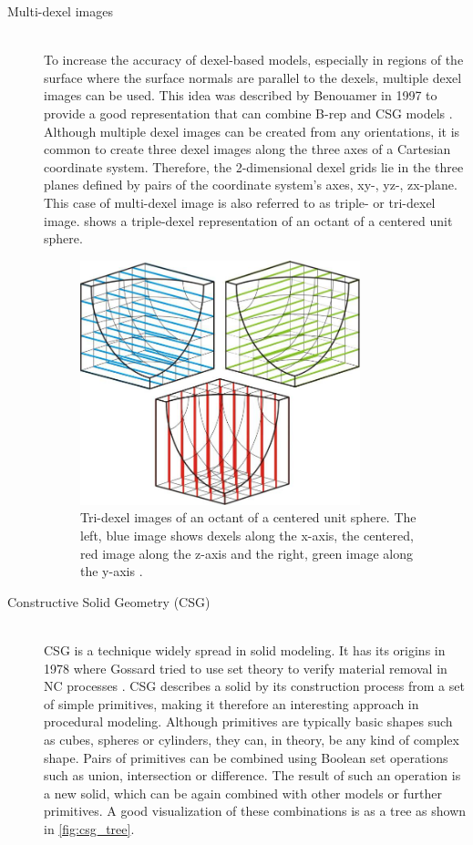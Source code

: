 \begin{description}
	\item[Multi-dexel images] \hfill \\
	To increase the accuracy of dexel-based models, especially in regions of the surface where the surface normals are parallel to the dexels, multiple dexel images can be used.
	This idea was described by Benouamer \etal in 1997 to provide a good representation that can combine B-rep and CSG models \cite{tridexel_intersection}.
	Although multiple dexel images can be created from any orientations, it is common to create three dexel images along the three axes of a Cartesian coordinate system.
	Therefore, the 2-dimensional dexel grids lie in the three planes defined by pairs of the coordinate system's axes, \ie xy-, yz-, zx-plane.
	This case of multi-dexel image is also referred to as triple- or tri-dexel image.
	 shows a triple-dexel representation of an octant of a centered unit sphere.

	\begin{figure}[H]
		\centering
		\includegraphics[width=0.8\textwidth]{images/tridexels}
		\caption{
			Tri-dexel images of an octant of a centered unit sphere.
			The left, blue image shows dexels along the x-axis, the centered, red image along the z-axis and the right, green image along the y-axis \cite{virtual_machining_review}.
		}
		\label{fig:tri_dexel_image}
	\end{figure}


	\item[Constructive Solid Geometry (CSG)] \hfill \\
	CSG is a technique widely spread in solid modeling.
	It has its origins in 1978 where Gossard \etal tried to use set theory to verify material removal in NC processes \cite{csg}.
	CSG describes a solid by its construction process from a set of simple primitives, making it therefore an interesting approach in procedural modeling.
	Although primitives are typically basic shapes such as cubes, spheres or cylinders, they can, in theory, be any kind of complex shape.
	Pairs of primitives can be combined using Boolean set operations such as union, intersection or difference.
	The result of such an operation is a new solid, which can be again combined with other models or further primitives.
	A good visualization of these combinations is as a tree as shown in \cref{fig:csg_tree}.


\end{description}
